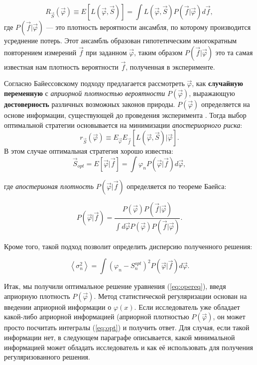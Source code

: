 \begin{equation}
	R_{\vec{S}}(\vec{\varphi}) \equiv E[L(\vec{\varphi},\vec{S})] = \int L(\vec{\varphi},\vec{S})P(\vec{f}|\vec{\varphi})d\vec{f}, 
\end{equation}
где $P(\vec{f}|\vec{\varphi})$ --- это плотность вероятности ансамбля, по которому производится усреднение потерь. Этот ансамбль образован гипотетическим многократным повторением  измерений $\vec{f}$ при заданном $\vec{\varphi}$, таким образом $P(\vec{f}|\vec{\varphi})$ это та самая известная нам плотность вероятности $\vec{f}$, полученная в эксперименте.

Согласно Байессовскому подходу предлагается рассмотреть $\vec{\varphi}$, как \textbf{случайную переменную} с \textit{априорной плотностью вероятности} $P(\vec{\varphi})$, выражающую \textbf{достоверность} различных возможных законов природы. $P(\vec{\varphi})$ определяется на основе информации, существующей до проведения эксперимента \cite{chernov}. Тогда выбор оптимальной стратегии основывается на минимизации \textit{апостериорного риска}:
\begin{equation}
	r_{\vec{S}}(\vec{\varphi}) \equiv E_{\vec{\varphi}}E_{\vec{f}}[L(\vec{\varphi},\vec{S})|\vec{\varphi}].
\end{equation}
В этом случае оптимальная стратегия хорошо известна:
\begin{equation}
	\label{eq:opt}
	\vec{S}_{opt} = E[\vec{\varphi}|\vec{f}] =\int \varphi_n P(\vec{\varphi}|\vec{f})d\vec{\varphi},
\end{equation}

\noindent  где \textit{апостерионая плотность} $P(\vec{\varphi}|\vec{f})$ определяется по теореме Баейса:

\begin{equation}
P(\vec{\varphi}|\vec{f})= \frac{P(\vec{\varphi})P(\vec{f}|\vec{\varphi})}{\int d\vec{\varphi}P(\vec{\varphi})P(\vec{f}|\vec{\varphi})} .
\end{equation}

\noindent Кроме того, такой подход позволит определить дисперсию полученного решения:

\begin{equation}
\left\langle \sigma_n^2 \right\rangle = \int (\varphi_n - S^{opt}_n)^2 P(\vec{\varphi}|\vec{f})d\vec{\varphi}.
\end{equation}

Итак, мы получили оптимальное решение уравнения (\ref{eq:opereq}), введя априорную плотность $P(\vec{\varphi})$. Метод статистической регуляризации основан на введении априорной информации о $\varphi(x)$. Если исследователь уже обладает какой-либо априорной информацией (априорной плотностью $P(\vec{\varphi})$, он может просто посчитать интегралы (\ref{eq:opt}) и получить ответ. Для случая, если такой информации нет, в следующем параграфе описывается, какой минимальной информацией может обладать исследователь и как её использовать для получения регуляризованного решения.

